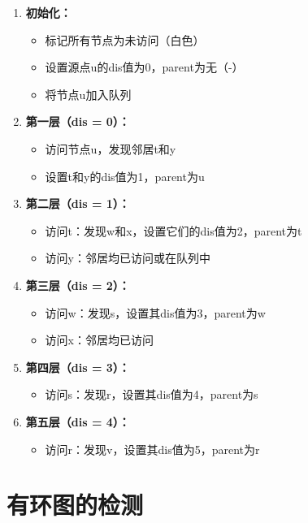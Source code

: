 \documentclass{article}
\begin{document}
\begin{enumerate}
    \item \textbf{初始化：}
    \begin{itemize}
        \item 标记所有节点为未访问（白色）
        \item 设置源点u的dis值为0，parent为无（-）
        \item 将节点u加入队列
    \end{itemize}
    
    \item \textbf{第一层（dis = 0）：}
    \begin{itemize}
        \item 访问节点u，发现邻居t和y
        \item 设置t和y的dis值为1，parent为u
    \end{itemize}
    
    \item \textbf{第二层（dis = 1）：}
    \begin{itemize}
        \item 访问t：发现w和x，设置它们的dis值为2，parent为t
        \item 访问y：邻居均已访问或在队列中
    \end{itemize}
    
    \item \textbf{第三层（dis = 2）：}
    \begin{itemize}
        \item 访问w：发现s，设置其dis值为3，parent为w
        \item 访问x：邻居均已访问
    \end{itemize}
    
    \item \textbf{第四层（dis = 3）：}
    \begin{itemize}
        \item 访问s：发现r，设置其dis值为4，parent为s
    \end{itemize}
    
    \item \textbf{第五层（dis = 4）：}
    \begin{itemize}
        \item 访问r：发现v，设置其dis值为5，parent为r
    \end{itemize}
\end{enumerate}
\section{有环图的检测}
\end{document}
